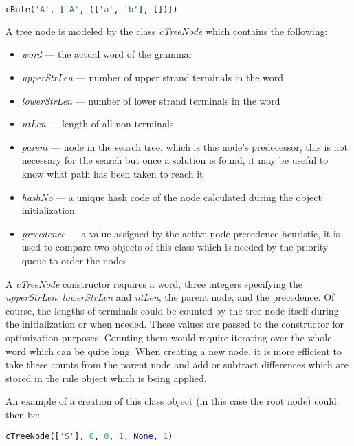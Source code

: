 \begin{lstlisting}[language=Python]
  cRule('A', ['A', (['a', 'b'], [])])
\end{lstlisting}

\bigskip

A tree node is modeled by the class \textit{cTreeNode} which contains the following:
\begin{itemize}
  \item{\textit{word} --- the actual word of the grammar}
  \item{\textit{upperStrLen} --- number of upper strand terminals in the word}
  \item{\textit{lowerStrLen} --- number of lower strand terminals in the word}
  \item{\textit{ntLen} --- length of all non-terminals}
  \item{\textit{parent} --- node in the search tree, which is this node's  predecessor, this is not necessary for the search but once a solution is found, it may be useful to know what path has been taken to reach it}
  \item{\textit{hashNo} --- a unique hash code of the node calculated during the object initialization}
  \item{\textit{precedence} --- a value assigned by the active node precedence heuristic, it is used to compare two objects of this class which is needed by the priority queue to order the nodes}
\end{itemize}

A \textit{cTreeNode} constructor requires a word, three integers specifying the \textit{upperStrLen}, \textit{lowerStrLen} and \textit{ntLen}, the parent node, and the precedence. Of course, the lengths of terminals could be counted by the tree node itself during the initialization or when needed. These values are passed to the constructor for optimization purposes. Counting them would require iterating over the whole word which can be quite long. When creating a new node, it is more efficient to take these counts from the parent node and add or subtract differences which are stored in the rule object which is being applied.

An example of a creation of this class object (in this case the root node) could then be:

\begin{lstlisting}[language=Python]
  cTreeNode(['S'], 0, 0, 1, None, 1)
\end{lstlisting}

\bigskip

